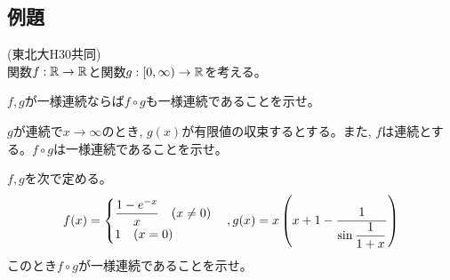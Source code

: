 \subsection{例題}
\begin{egprob} (東北大H30共同)\\
関数$f:\mathbb{R}\to \mathbb{R}$と関数$g:[0,\infty) \to \mathbb{R}$を考える。
\ben
\item
\ben
\item $f,g$が一様連続ならば$f\circ g$も一様連続であることを示せ。
\item $g$が連続で$x\to \infty$のとき, $g(x)$が有限値の収束するとする。また, $f$は連続とする。$f\circ g$は一様連続であることを示せ。
\een
\item $f,g$を次で定める。
{\small
\[f(x) = \begin{cases}
\dfrac{1-e^{-x}}{x} \quad (x\neq 0)\\ 1\quad (x=0)
\end{cases},  g(x) = x\left(x+1 - \dfrac{1}{\sin{\dfrac{1}{1+x}}}\right)\]
}
\een
このとき$f\circ g$が一様連続であることを示せ。
\end{egprob}
